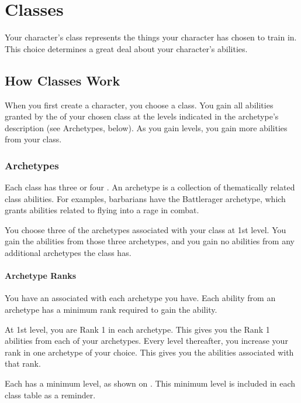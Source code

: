 \chapter{Classes}\label{Classes}

Your character's class represents the things your character has chosen to train in.
This choice determines a great deal about your character's abilities.

\section{How Classes Work}
    When you first create a character, you choose a class.
    You gain all abilities granted by the  of your chosen class at the levels indicated in the archetype's description (see Archetypes, below).
    As you gain levels, you gain more abilities from your class.

    \subsection{Archetypes}\label{Archetypes}
        Each class has three or four .
        An archetype is a collection of thematically related class abilities.
        For examples, barbarians have the Battlerager archetype, which grants abilities related to flying into a rage in combat.

        You choose three of the archetypes associated with your class at 1st level.
        You gain the abilities from those three archetypes, and you gain no abilities from any additional archetypes the class has.

        \subsubsection{Archetype Ranks}\label{Archetype Ranks}
            You have an  associated with each archetype you have.
            Each ability from an archetype has a minimum rank required to gain the ability.

            At 1st level, you are Rank 1 in each archetype.
            This gives you the Rank 1 abilities from each of your archetypes.
            Every level thereafter, you increase your rank in one archetype of your choice.
            This gives you the abilities associated with that rank.

            Each  has a minimum level, as shown on .
            This minimum level is included in each class table as a reminder.

